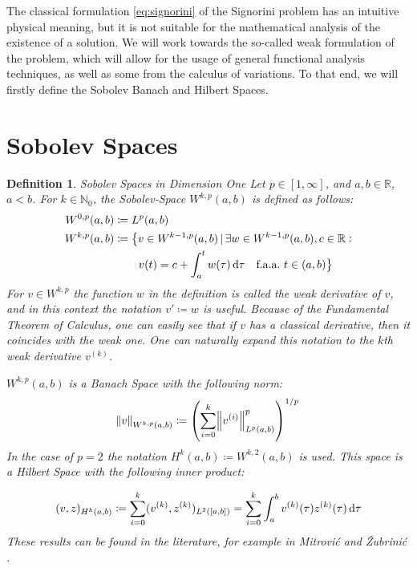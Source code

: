 \documentclass[headsepline,footsepline,footinclude=false,oneside,fontsize=11pt,paper=a4,listof=totoc,bibliography=totoc]{scrbook} %
\newtheorem{definition}{Definition}
\begin{document}
The classical formulation \eqref{eq:signorini} of the Signorini problem has an intuitive physical meaning, but it is not suitable for the mathematical analysis of the existence of a solution. We will work towards the so-called weak formulation of the problem, which will allow for the usage of general functional analysis techniques, as well as some from the calculus of variations. To that end, we will firstly define the Sobolev Banach and Hilbert Spaces.

\section{Sobolev Spaces}
\begin{definition}Sobolev Spaces in Dimension One\newline
	Let $p\in [1,\infty]$, and $a,b \in \mathbb{R}$, $a<b$. For $k \in \mathbb{N}_0$, the Sobolev-Space $W^{k,p}(a,b)$ is defined as follows:
	\begin{align}
	\begin{split}
	W^{0,p}(a,b) &\coloneqq L^p(a,b) \\
	W^{k,p}(a,b) &\coloneqq \big\{ v \in W^{k-1,p}(a,b) \,|\, \exists w \in W^{k-1,p}(a,b), c\in\mathbb{R}: \\
	& \phantom{\coloneqq \big\{\,\,} v(t) =  c + \int_a^t w(\tau) \dif \tau \quad \text{f.a.a.} \,\, t\in (a,b)  \big\}
	\end{split}
	\end{align}
	For $v\in W^{k,p}$ the function $w$ in the definition is called the weak derivative of $v$, and in this context the notation $v' \coloneqq w$ is useful. Because of the Fundamental Theorem of Calculus, one can easily see that if $v$ has a classical derivative, then it coincides with the weak one. One can naturally expand this notation to the $k$th weak derivative $v^{(k)}$.
	
	$W^{k,p}(a,b)$ is a Banach Space with the following norm:
	\begin{equation}
	\norm{v}_{W^{k,p}(a,b)} \coloneqq \left(\sum\limits_{i = 0}^k \norm{v^{(i)}}_{L^p(a,b)}^p\right)^{1/p} \label{eq:sobolev1_norm}
	\end{equation}
	In the case of $p=2$ the notation $H^k(a,b) \coloneqq W^{k,2}(a,b)$ is used. This space is a Hilbert Space with the following inner product:
	
	\begin{equation}
	(v,z)_{H^k(a,b)} \coloneqq \sum_{i=0}^{k} (v^{(k)}, z^{(k)})_{L^2([a,b])} = \sum_{i=0}^{k} \int_a^b v^{(k)}(\tau)z^{(k)}(\tau) \dif \tau \label{eq:sobolev1_inner_product}
	\end{equation}
	These results can be found in the literature, for example in Mitrović and Žubrinić \cite[Chapter 5, Section 2, Remark 2]{mitrovic1997fundamentals}.
\end{definition}
\end{document}
